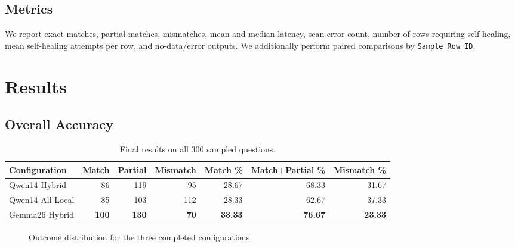 \documentclass[11pt]{article}
\begin{document}
\subsection{Metrics}

We report exact matches, partial matches, mismatches, mean and median latency, scan-error count, number of rows requiring self-healing, mean self-healing attempts per row, and no-data/error outputs. We additionally perform paired comparisons by \texttt{Sample Row ID}.

\section{Results}

\subsection{Overall Accuracy}

\begin{table}[H]
\centering
\caption{Final results on all 300 sampled questions.}
\label{tab:mainresults}
\begin{tabular}{lrrrrrr}
\toprule
\textbf{Configuration} & \textbf{Match} & \textbf{Partial} & \textbf{Mismatch} &
\textbf{Match \%} & \textbf{Match+Partial \%} & \textbf{Mismatch \%}\\
\midrule
Qwen14 Hybrid & 86 & 119 & 95 & 28.67 & 68.33 & 31.67\\
Qwen14 All-Local & 85 & 103 & 112 & 28.33 & 62.67 & 37.33\\
Gemma26 Hybrid & \textbf{100} & \textbf{130} & \textbf{70} & \textbf{33.33} & \textbf{76.67} & \textbf{23.33}\\
\bottomrule
\end{tabular}
\end{table}

\begin{figure}[H]
\centering
{}
\caption{Outcome distribution for the three completed configurations.}
\label{fig:outcomes}
\end{figure}
\end{document}
